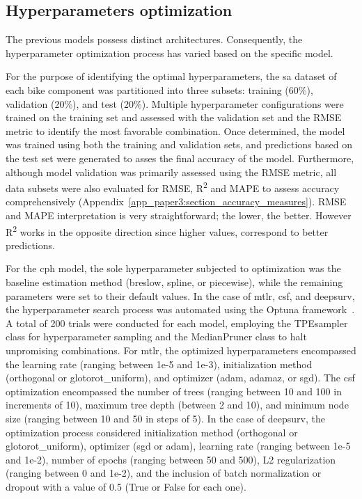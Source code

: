     \subsection{Hyperparameters optimization}
The previous models possess distinct architectures. Consequently, the hyperparameter optimization process has varied based on the specific model.

For the purpose of identifying the optimal hyperparameters, the \ac{sa} dataset of each bike component was partitioned into three subsets: training (60\%), validation (20\%), and test (20\%). Multiple hyperparameter configurations were trained on the training set and assessed with the validation set and the RMSE metric to identify the most favorable combination. Once determined, the model was trained using both the training and validation sets, and predictions based on the test set were generated to asses the final accuracy of the model. Furthermore, although model validation was primarily assessed using the RMSE metric, all data subsets were also evaluated for RMSE, R\textsuperscript{2} and MAPE to assess accuracy comprehensively (Appendix~\ref{app_paper3:section_accuracy_measures}). RMSE and MAPE interpretation is very straightforward; the lower, the better. However R\textsuperscript{2} works in the opposite direction since higher values, correspond to better predictions.

For the \ac{cph} model, the sole hyperparameter subjected to optimization was the baseline estimation method (breslow, spline, or piecewise), while the remaining parameters were set to their default values. In the case of \ac{mtlr}, \ac{csf}, and \ac{deepsurv}, the hyperparameter search process was automated using the Optuna framework~\cite{Optuna2019}. A total of 200 trials were conducted for each model, employing the TPEsampler class for hyperparameter sampling and the MedianPruner class to halt unpromising combinations. For \ac{mtlr}, the optimized hyperparameters encompassed the learning rate (ranging between 1e-5 and 1e-3), initialization method (orthogonal or glotorot\_uniform), and optimizer (adam, adamaz, or sgd). The \ac{csf} optimization encompassed the number of trees (ranging between 10 and 100 in increments of 10), maximum tree depth (between 2 and 10), and minimum node size (ranging between 10 and 50 in steps of 5). In the case of \ac{deepsurv}, the optimization process considered initialization method (orthogonal or glotorot\_uniform), optimizer (sgd or adam), learning rate (ranging between 1e-5 and 1e-2), number of epochs (ranging between 50 and 500), L2 regularization (ranging between 0 and 1e-2), and the inclusion of batch normalization or dropout with a value of 0.5 (True or False for each one).
